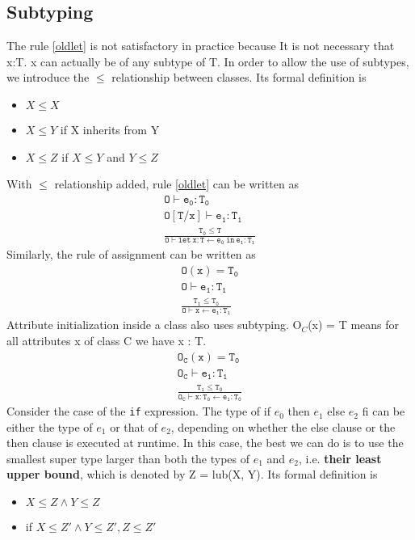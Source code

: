 \subsection{Subtyping} 
The rule \eqref{oldlet} is not satisfactory in practice because It is not necessary that x:T. {\sf x} can actually be of any subtype of T.  In order to allow the use of subtypes, we introduce the $\leq$ relationship between classes. Its formal definition is 
\begin{itemize}
\item $X\leq X$
\item $X\leq Y$ if X inherits from Y
\item $X\leq Z$ if $X\leq Y$ and $Y\leq Z$
\end{itemize}
With $\leq$ relationship added, rule \eqref{oldlet} can be written as 
\begin{gather*}
\mathtt{O\vdash e_0:T_0}\\
\mathtt{O[T/x]\vdash e_1:T_1}\\
\mathtt{\frac{T_0\leq T}{ O\vdash let\:x:T\leftarrow e_0\:in\:e_1:T_1}}
\end{gather*}
Similarly, the rule of assignment can be written as
\begin{gather*}
\mathtt{O(x) = T_0}\\
\mathtt{O\vdash e_1:T_1}\\
\mathtt{\frac{T_1\leq T_0}{ O\vdash x\leftarrow e_1:T_1}}
\end{gather*}
Attribute initialization inside a class also uses subtyping. O$_C$(x) = T means for all attributes x of class C we have x : T.
\begin{gather*}
\mathtt{O_C(x)=T_0}\\
\mathtt{O_C\vdash e_1:T_1}\\
\mathtt{\frac{T_1\leq T_0}{ O_C\vdash x:T_0\leftarrow e_1:T_0}}
\end{gather*}
Consider the case of the \texttt{if} expression. The type of {\sf if $e_0$ then $e_1$ else $e_2$ fi} can be either the type of $e_1$ or that of $e_2$, depending on whether the else clause or the then clause is executed at runtime. In this case, the best we can do is to use the smallest super type larger than both the types of $e_1$ and $e_2$, i.e. \textbf{their least upper bound}, which is denoted by {\sf Z = lub(X, Y)}. Its formal definition is 
\begin{itemize}
\item $X\leq Z\land Y\leq Z$
\item if $X\leq Z'\land Y\leq Z', Z\leq Z'$
\end{itemize}
